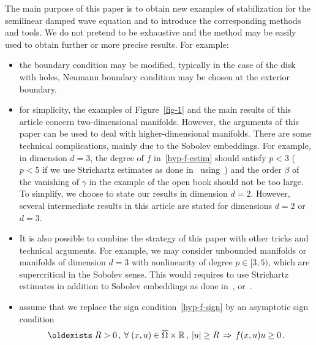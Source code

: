 \documentclass[10pt]{amsart}
\theoremstyle{definition}\newtheorem{defi}[theo]{Definition}\newtheorem{rema}[theo]{Remark}\newtheorem{exam}[theo]{Example}\newtheorem{exem}[theo]{Example}\newtheorem{nota}[theo]{Notation}
\newcommand{\RR}{\mathbb{R}}
\renewcommand*{\exists}{\mathrel{\oldexists}}
\let\oldforall\forall
\renewcommand*{\forall}{\mathrel{\oldforall}}
\begin{document}
The main purpose of this paper is to obtain new examples of stabilization for the semilinear damped wave equation and to introduce the corresponding methods and tools. We do not pretend to be exhaustive and the method may be easily used to obtain further or more precise results. For example:
\begin{itemize}
\item the boundary condition may be modified, typically in the case of the disk with holes, Neumann boundary condition may be chosen at the exterior boundary.
\item for simplicity, the examples of Figure~\ref{fig-1} and the main results of this article concern two-dimensional manifolds. However, the arguments of this paper can be used to deal with higher-dimensional manifolds. There are some technical complications, mainly due to the Sobolev embeddings. For example, in dimension $d=3$, the degree of $f$ in~\eqref{hyp-f-estim} should satisfy $p<3$ ($p<5$ if we use Strichartz estimates as done in~\cite{RC} using~\cite{DLZ}) and the order $\beta$ of the vanishing of $\gamma$ in the example of the open book should not be too large. To simplify, we choose to state our results in dimension $d=2$. However, several intermediate results in this article are stated for dimensions $d=2$ or $d=3$.
\item It is also possible to combine the strategy of this paper with other tricks and technical arguments. For example, we may consider unbounded manifolds or manifolds of dimension $d=3$ with nonlinearity of degree $p\in [3,5)$, which are supercritical in the Sobolev sense. This would requires to use Strichartz estimates in addition to Sobolev embeddings as done in~\cite{Dehman}, \cite{DLZ} or~\cite{RC}.
\item assume that we replace the sign condition~\eqref{hyp-f-sign} by an asymptotic sign condition
\[
\exists R>0\,,\:\forall (x,u)\in
\overline\Omega\times\RR\,,\:|u|\geq R\,\Rightarrow\,f(x,u)u\geq 0\,.
\]

\end{itemize}
\end{document}
